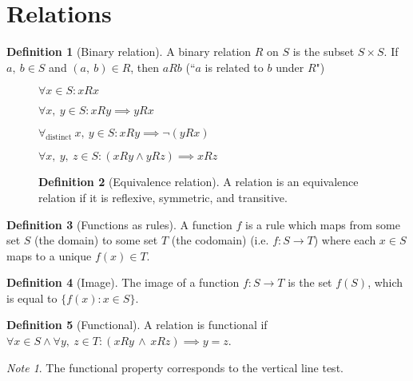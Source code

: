 \documentclass{article}
\theoremstyle{plain}
\numberwithin{theorem}{subsection}
\theoremstyle{definition}
\newtheorem{definition}{Definition}[section]
\numberwithin{definition}{subsection}
\theoremstyle{remark}
\newtheorem{note}{Note}[section]
\numberwithin{note}{subsection}
\begin{document}
\section{Relations}
\begin{definition}[Binary relation]
    A binary relation $R$ on $S$ is the subset $S\times S$.
    If $a, \: b \in S$ and  $(a, \: b) \in R$,
    then $aRb$ (``$a$ is related to $b$ under $R$")
\end{definition}
%
\begin{figure}[H]
    \begin{mdframed}[style=exampledefault,frametitle={Relation Properties}]
        \begin{description}[style=sameline]
            \item[Reflexive]
                $\forall x \in S : xRx$
            \item[Symmetric]
                $\forall x,\: y \in S : xRy \implies yRx$
            \item[Antisymmetric]
                $\forall_\text{distinct} \: x,\: y \in S : xRy \implies \neg (yRx)$
            \item[Transitive]
                $\forall x,\: y, \: z \in S : (xRy \land yRz) \implies xRz$
        \end{description}
        \begin{definition}[Equivalence relation]
            A relation is an equivalence relation if it is
            reflexive, symmetric, and transitive.
        \end{definition}
    \end{mdframed}
\end{figure}
%
\begin{definition}[Functions as rules]
    A function $f$ is a rule which maps
    from some set $S$ (the domain)
    to some set $T$ (the codomain)
    (i.e. $f: S \to T$) where each $x \in S$ maps to a unique $f(x) \in T$.
\end{definition}
\begin{definition}[Image]
    The image of a function $f: S \to T$ is the set $f(S)$,
    which is equal to $\{f(x):x \in S\}$.
\end{definition}
\begin{definition}[Functional]
    A relation is functional if
    $\forall x \in S \land \forall y,\: z \in T
        : (xRy \, \land \, xRz) \implies y=z$.
\end{definition}
\begin{note}
    The functional property corresponds to the vertical line test.
\end{note}
\end{document}
